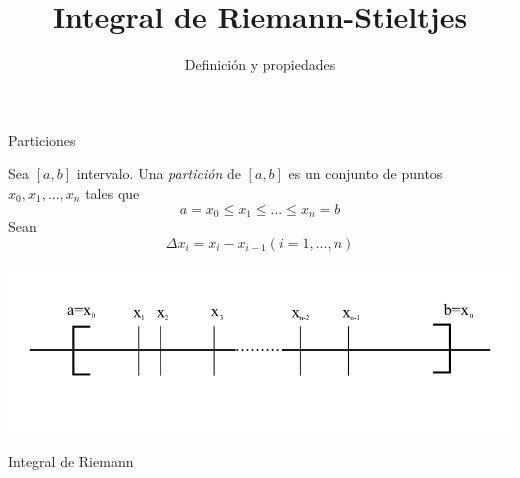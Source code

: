 \documentclass[11pt]{beamer}
\author{Definición y propiedades}
\title{Integral de Riemann-Stieltjes}
\begin{document}
\begin{frame}
\titlepage
\end{frame}


\begin{frame}{Particiones}

\begin{definition}
Sea $[a, b]$ intervalo. Una \textit{partición} de $[a, b]$ es un conjunto de puntos $x_0, x_1,..., x_n$ tales que
\[
	a = x_0 \leq x_1 \leq ... \leq x_n = b
\]
Sean
\[
	\Delta x_i = x_i - x_{i-1} (i = 1, ..., n)
\]
\end{definition}

\begin{center}
\includegraphics[scale=1]{img/particion.png}
\end{center}

\end{frame}

\begin{frame}{Integral de Riemann}



\end{frame}
\end{document}
